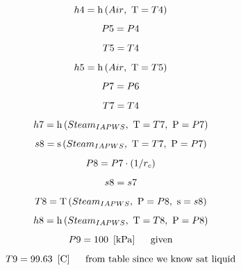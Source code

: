 \documentclass[10pt,fleqn]{article}
\newcommand{\F}[1]{\mbox{$#1$}}
\newcommand{\V}[1]{\mbox{$ #1 $}}
\newcommand{\I}{\mbox{\hspace{0.20in}}}
\newcommand{\temperature}{\mathrm{T}}
\newcommand{\enthalpy}{\mathrm{h}}
\newcommand{\entropy}{\mathrm{s}}
\begin{document}
\begin{equation}
\label{EES Eqn:25}
\V{h4}  = \enthalpy \left(\F{Air},\mbox{\ T}=\V{T4}  \right)  
\end{equation}
\begin{equation}
\label{EES Eqn:26}
\V{P5}  = \V{P4}  
\end{equation}
\begin{equation}
\label{EES Eqn:27}
\V{T5}  = \V{T4}  
\end{equation}
\begin{equation}
\label{EES Eqn:28}
\V{h5} =\enthalpy \left(\F{Air},\mbox{\ T}=\V{T5}  \right)  
\end{equation}
\begin{equation}
\label{EES Eqn:29}
\V{P7}  = \V{P6}  
\end{equation}
\begin{equation}
\label{EES Eqn:30}
\V{T7}  = \V{T4}  
\end{equation}
\begin{equation}
\label{EES Eqn:31}
\V{h7} =\enthalpy \left(\F{Steam}_{IAPWS},\mbox{\ T}=\V{T7} ,\mbox{\ P}=\V{P7}  \right)  
\end{equation}
\begin{equation}
\label{EES Eqn:32}
\V{s8} =\entropy \left(\F{Steam}_{IAPWS},\mbox{\ T}=\V{T7} ,\mbox{\ P}=\V{P7}  \right)  
\end{equation}
\begin{equation}
\label{EES Eqn:33}
\V{P8}  = \V{P7} \cdot  \left( 1/r_{c} \right)  
\end{equation}
\begin{equation}
\label{EES Eqn:34}
\V{s8}  = \V{s7}  
\end{equation}
\begin{equation}
\label{EES Eqn:35}
\V{T8} =\temperature \left(\F{Steam}_{IAPWS},\mbox{\ P}=\V{P8} ,\mbox{\ s}=\V{s8}  \right)  
\end{equation}
\begin{equation}
\label{EES Eqn:36}
\V{h8}  = \enthalpy \left(\F{Steam}_{IAPWS},\mbox{\ T}=\V{T8} ,\mbox{\ P}=\V{P8}  \right)  
\end{equation}
\begin{equation}
\label{EES Eqn:37}
\V{P9}  = 100   \   \left[ \rm kPa \right] 
\mbox{\I given}
\end{equation}
\begin{equation}
\label{EES Eqn:38}
\V{T9}  = 99.63   \   \left[ \rm C \right] 
\mbox{\I from table since we know sat liquid}
\end{equation}
\end{document}
